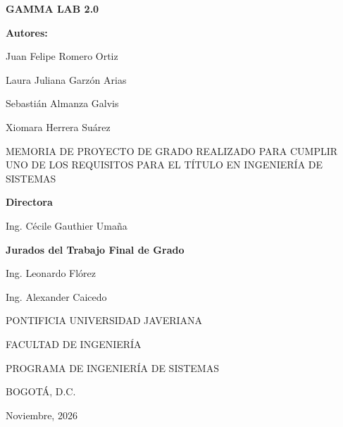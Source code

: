 \documentclass[12pt,letterpaper,oneside]{article}
\newcommand{\tituloProyecto}{GAMMA LAB 2.0}
\newcommand{\autorUno}{Juan Felipe Romero Ortiz}
\newcommand{\autorDos}{Laura Juliana Garzón Arias}
\newcommand{\autorTres}{Sebastián Almanza Galvis}
\newcommand{\autorCuatro}{Xiomara Herrera Suárez}
\newcommand{\leyendaGrado}{MEMORIA DE PROYECTO DE GRADO REALIZADO PARA CUMPLIR UNO DE
LOS REQUISITOS PARA EL TÍTULO EN INGENIERÍA DE SISTEMAS}
\newcommand{\director}{Ing. Cécile Gauthier Umaña}
\newcommand{\juradoUno}{Ing. Leonardo Flórez}
\newcommand{\juradoDos}{Ing. Alexander Caicedo}
\newcommand{\universidad}{PONTIFICIA UNIVERSIDAD JAVERIANA}
\newcommand{\facultad}{FACULTAD DE INGENIERÍA}
\newcommand{\programa}{PROGRAMA DE INGENIERÍA DE SISTEMAS}
\newcommand{\ciudad}{BOGOTÁ, D.C.}
\newcommand{\fechaLarga}{Noviembre, 2026}      %
\begin{document}
\begin{center}
  {\Large\bfseries \tituloProyecto}\par
  \vspace{1.4cm}

  {\bfseries Autores:}\par
  \vspace{0.5cm}
  \autorUno\par
  \autorDos\par
  \autorTres\par
  \autorCuatro\par
  \vspace{1.4cm}

  \leyendaGrado\par
  \vspace{1.4cm}

  {\bfseries Directora}\par
  \vspace{0.4cm}
  \director\par
  \vspace{1.2cm}

  {\bfseries Jurados del Trabajo Final de Grado}\par
  \vspace{0.4cm}
  \juradoUno\par
  \juradoDos\par
  \vspace{1.8cm}

  \universidad\par\vspace{0.6cm}
  \facultad\par\vspace{0.6cm}
  \programa\par\vspace{0.6cm}
  \ciudad\par\vspace{0.6cm}
  \fechaLarga\par
\end{center}
\clearpage
\end{document}
